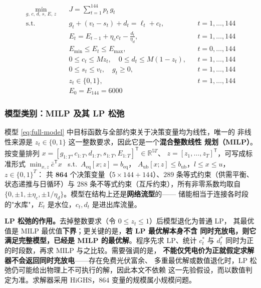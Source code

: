 \documentclass[withoutpreface,bwprint]{cumcmthesis}
\begin{document}
\begin{equation}
\begin{aligned}
  \min_{g,\,c,\,d,\,s,\,E,\,z} \quad & J = \sum_{t=1}^{144} p_t\, g_t \\[2pt]
  \text{s.t.} \quad
  & g_t + (v_t - s_t) + d_t = \ell_t + c_t, && t = 1,\dots,144 \\
  & E_t = E_{t-1} + \eta_c c_t - \frac{d_t}{\eta_d}, && t = 1,\dots,144 \\
  & E_{\min} \le E_t \le E_{\max}, && t = 0,\dots,144 \\
  & 0 \le c_t \le M z_t, \quad 0 \le d_t \le M(1-z_t), && t = 1,\dots,144 \\
  & 0 \le s_t \le v_t, \quad g_t \ge 0, && t = 1,\dots,144 \\
  & z_t \in \{0,1\}, && t = 1,\dots,144 \\
  & E_0 = E_{144} = 6000
\end{aligned}
\label{eq:full-model}
\end{equation}

\subsubsection{模型类别：MILP 及其 LP 松弛}

模型 \eqref{eq:full-model} 中目标函数与全部约束关于决策变量均为线性，唯一的
非线性来源是 $z_t \in \{0,1\}$ 这一整数要求，因此它是一个\textbf{混合整数线性
规划（MILP）}。按变量排列
$x=[g_{1:T},c_{1:T},d_{1:T},s_{1:T},E_{1:T}]^{\mathsf T}\in\mathbb R^{5T}$、
$z=[z_1,\dots,z_T]^{\mathsf T}$，可写成标准形式
$\min_{x,z}\bar c^{\mathsf T}x$ \ s.t.\ $A_{\mathrm{eq}}[x;z]=b_{\mathrm{eq}}$，
$A_{\mathrm{ub}}[x;z]\le b_{\mathrm{ub}}$，$l\le x\le u$，$z\in\{0,1\}^T$：
共 $\mathbf{864}$ 个决策变量（$5\times144+144$）、$289$ 条等式约束（供需平衡、
状态递推与日循环）与 $288$ 条不等式约束（互斥约束），所有非零系数均取自
$\{0,\pm1,\pm\eta_c,\pm1/\eta_d\}$。模型在结构上还是\textbf{网络流型}的——
储能相当于连接各时段的"水库"，$E_t$ 是水位，$c_t,d_t$ 是进出库流量。

\textbf{LP 松弛的作用。}去掉整数要求（令 $0\le z_t\le1$）后模型退化为普通 LP，
其最优值是 MILP 最优值\textbf{下界}；更关键的是，\textbf{若 LP 最优解本身不含
同时充放电，则它满足完整模型，已经是 MILP 的最优解}。程序先求 LP、统计
$c_t^*$ 与 $d_t^*$ 同时为正的时段数，再求 MILP 与之比较。需要强调的是，
\textbf{不能仅凭电价为正就假定求解器不会返回同时充放电}——存在免费光伏富余、
多重最优解或数值退化时，LP 松弛仍可能给出物理上不可执行的解，因此本文不依赖
这一先验假设，而以数值判定为准。求解器采用 HiGHS，$864$ 变量的规模属小规模问题。
\end{document}

